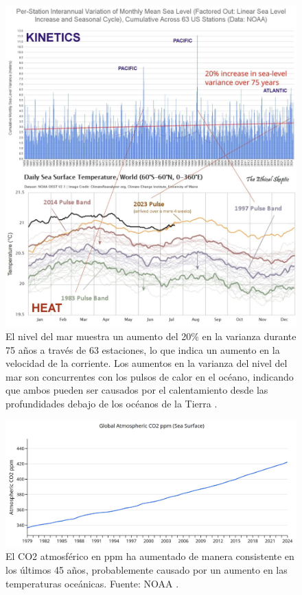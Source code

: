\documentclass[10pt,twocolumn,letterpaper]{article}
\begin{document}
\begin{figure}[t]
\begin{center}
\includegraphics[width=1\textwidth]{sealevel.jpeg}
\end{center}
   \caption{El nivel del mar muestra un aumento del 20\% en la varianza durante 75 años a través de 63 estaciones, lo que indica un aumento en la velocidad de la corriente. Los aumentos en la varianza del nivel del mar son concurrentes con los pulsos de calor en el océano, indicando que ambos pueden ser causados por el calentamiento desde las profundidades debajo de los océanos de la Tierra \cite{2,129}.}
\label{fig:22}
\end{figure}
\begin{figure}[t]
\begin{center}
\includegraphics[width=1\textwidth]{co2.jpg}
\end{center}
   \caption{El CO2 atmosférico en ppm ha aumentado de manera consistente en los últimos 45 años, probablemente causado por un aumento en las temperaturas oceánicas. Fuente: NOAA \cite{148,129}.}
\label{fig:23}
\end{figure}
\end{document}
